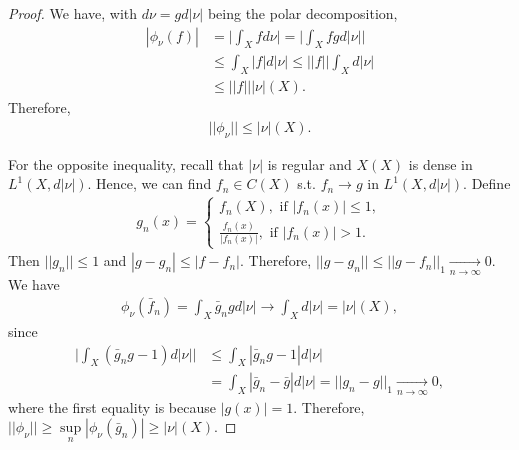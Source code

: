 \begin{proof}
    We have, with \(d\nu = gd|\nu|\) being the polar decomposition,
    \begin{align*}
        |\phi_{\nu}(f)| &= \Big\vert \int_X fd\nu\Big\vert = \Big\vert\int_X fgd|\nu|\Big\vert \\ 
        &\leq \int_X |f|d|\nu| \leq ||f||\int_Xd|\nu| \\
        &\leq ||f|| |\nu|(X).
    \end{align*}
    Therefore,
    \begin{align*}
        ||\phi_{\nu}|| \leq |\nu|(X).
    \end{align*}

    For the opposite inequality, recall that \(|\nu|\) is regular and \(X(X)\) is dense in \(L^1(X,d|\nu|)\). Hence, we can find \(f_n\in C(X)\) s.t. \(f_n\rightarrow g\) in \(L^1(X,d|\nu|)\). Define
    \begin{align*}
        g_n(x) = \begin{cases}
            f_n(X), \text{ if } |f_n(x)|\leq 1, \\
            \frac{f_n(x)}{|f_n(x)|}, \text{ if } |f_n(x)|>1.
        \end{cases}
    \end{align*}
    Then \(||g_n||\leq 1\) and \(|g-g_n|\leq |f - f_n|\). Therefore, \(||g-g_n||\leq ||g-f_n||_1\xrightarrow[n\rightarrow\infty]{ }0\). We have
    \begin{align*}
        \phi_{\nu}(\bar{f}_n) = \int_X\bar{g}_n gd|\nu|\rightarrow \int_X d|\nu| = |\nu|(X),
    \end{align*}
    since
    \begin{align*}
        \Big\vert \int_X \left(\bar{g}_n g -1\right) d|\nu|\Big\vert &\leq \int_X |\bar{g}_n g-1| d|\nu|\\
        &=\int_X|\bar{g}_n - \bar{g}|d|\nu| = ||g_n - g||_1 \xrightarrow[n\rightarrow\infty]{ } 0,
    \end{align*}
    where the first equality is because \(|g(x)|=1\). Therefore, \(||\phi_{\nu}||\geq \sup\limits_{n}|\phi_{\nu}(\bar{g}_n)|\geq |\nu|(X)\).
\end{proof}
\fi 